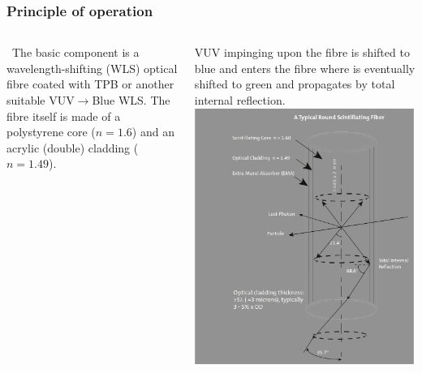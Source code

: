 \begin{frame}
\frametitle{Principle of operation}
\begin{columns}

\blt\ The basic component is a wavelength-shifting (WLS) optical fibre coated with TPB or another suitable VUV$\rightarrow$Blue WLS. The fibre itself is made of a polystyrene core ($n=1.6$) and an acrylic (double) cladding ($n=1.49$).

\blt VUV impinging upon the fibre is shifted to blue and enters the fibre where is eventually shifted to green and propagates by total internal reflection.
\includegraphics[scale=0.6]{img/fibers_tirf.png}

\end{columns}

\end{frame}


